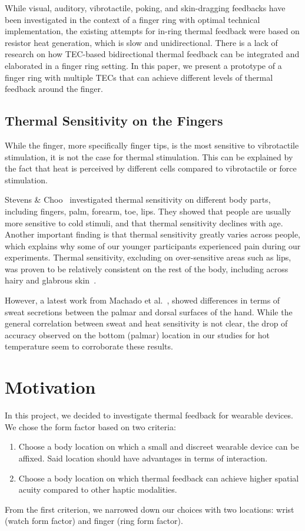 \documentclass[preprint,12pt]{elsarticle}
\begin{document}
While visual, auditory, vibrotactile, poking, and skin-dragging feedbacks have been investigated in the context of a finger ring with optimal technical implementation, the existing attempts for in-ring thermal feedback were based on resistor heat generation, which is slow and unidirectional. There is a lack of research on how TEC-based bidirectional thermal feedback can be integrated and elaborated in a finger ring setting. In this paper, we present a prototype of a finger ring with multiple TECs that can achieve different levels of thermal feedback around the finger.


\subsection{Thermal Sensitivity on the Fingers}
While the finger, more specifically finger tips, is the most sensitive to vibrotactile stimulation, it is not the case for thermal stimulation.
This can be explained by the fact that heat is perceived by different cells compared to vibrotactile or force stimulation.

Stevens \& Choo~\cite{31} investigated thermal sensitivity on different body parts, including fingers, palm, forearm, toe, lips.
They showed that people are usually more sensitive to cold stimuli, and that thermal sensitivity declines with age.
Another important finding is that thermal sensitivity greatly varies across people, which explains why some of our younger participants experienced pain during our experiments.
Thermal sensitivity, excluding on over-sensitive areas such as lips, was proven to be relatively consistent on the rest of the body, including across hairy and glabrous skin~\cite{31}.

However, a latest work from Machado et al.~\cite{Machado2008}, showed differences in terms of sweat secretions between the palmar and dorsal surfaces of the hand.
While the general correlation between sweat and heat sensitivity is not clear, the drop of accuracy observed on the bottom (palmar) location in our studies for hot temperature seem to corroborate these results.

\section{Motivation}
In this project, we decided to investigate thermal feedback for wearable devices.
We chose the form factor based on two criteria:
\begin{enumerate}
  \item Choose a body location on which a small and discreet wearable device can be affixed. Said location should have advantages in terms of interaction.
  \item Choose a body location on which thermal feedback can achieve higher spatial acuity compared to other haptic modalities.
\end{enumerate}
From the first criterion, we narrowed down our choices with two locations: wrist (watch form factor) and finger (ring form factor).
\end{document}
